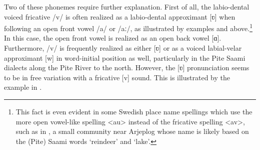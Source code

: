 Two of these phonemes require further explanation. First of all, the labio-dental voiced fricative /v/ is often realized as a labio-dental approximant [ʋ] when following an open front vowel /a/ or /aː/, as illustrated by examples  and  above.\footnote{This fact is even evident in some Swedish place name spellings which use the more open vowel-like spelling <au> instead of the fricative spelling <av>, such as in , a small community near Arjeplog whose name is likely based on the (Pite) Saami words  ‘reindeer’ and  ‘lake’.} %
In this case, the open front vowel is realized as an open back vowel [ɑ]. 
Furthermore, /v/ is frequently realized as either [ʋ] or as a voiced labial-velar approximant [w] in word-initial position as well, particularly in the Pite Saami dialects along the Pite River to the north. However, the [ʋ] pronunciation seems to be in free variation with a fricative [v] sound. 
This is illustrated by the example in .%
\ea\label{cheeseNOMSG}
\Tn{\begin{tabular}{p{18mm} x{22mm} l }%
\multirow{2}{*}{/\Bf{v}u͡asːta/} &[\Bf{w}u͡asːta]\textasciitilde & \It{vuassta}		\\%
					 &[\Bf{v}u͡asːta] 			& ‘cheese\BS\Sc{nom.sg}’ 	\\%
\end{tabular}
\hfill\pbox{\textwidth}{\hfill\hyperlink{pit110517b2}{\small[pit110517b2.038]}\\\hfill\hyperlink{pit080917c}{\small[pit080917c.9m42s]}}}
\z

